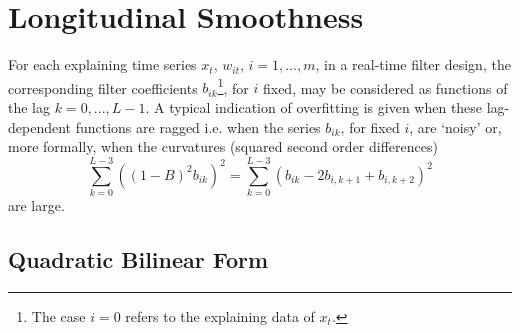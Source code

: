\documentclass[a4paper]{book}
\begin{document}
\section{Longitudinal Smoothness}


For each explaining time series $x_t$, $w_{it}$, $i=1,...,m$, in a real-time filter design, the corresponding filter coefficients $b_{ik}$\footnote{The case $i=0$ refers to the explaining data of $x_t$.}, for $i$ fixed, may be considered as functions of the lag $k=0,...,L-1$. A typical indication of overfitting is given when these lag-dependent functions are ragged i.e. when the series $b_{ik}$, for fixed $i$, are `noisy' or, more formally, when the curvatures (squared second order differences)
\begin{equation}\label{curvature_squa}
\sum_{k=0}^{L-3} \left((1-B)^2 b_{ik}\right)^2=\sum_{k=0}^{L-3}\left(b_{ik}-2b_{i,k+1}+b_{i,k+2}\right)^2
\end{equation}
are large.


\subsection{Quadratic Bilinear Form}
\end{document}
